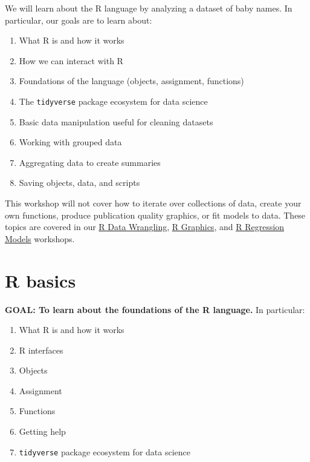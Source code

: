 \documentclass[
]{book}
\providecommand{\tightlist}{%
  \setlength{\itemsep}{0pt}\setlength{\parskip}{0pt}}
\begin{document}
\begin{alert}

We will learn about the R language by analyzing a dataset of baby names. In particular, our goals are to learn about:

\begin{enumerate}
\def\labelenumi{\arabic{enumi}.}
\tightlist
\item
  What R is and how it works
\item
  How we can interact with R
\item
  Foundations of the language (objects, assignment, functions)
\item
  The \texttt{tidyverse} package ecosystem for data science
\item
  Basic data manipulation useful for cleaning datasets
\item
  Working with grouped data
\item
  Aggregating data to create summaries
\item
  Saving objects, data, and scripts
\end{enumerate}

This workshop will not cover how to iterate over collections of data, create your own functions, produce publication quality graphics, or fit models to data. These topics are covered in our \href{./RDataWrangling.html}{R Data Wrangling}, \href{./Rgraphics.html}{R Graphics}, and \href{./Rmodels.html}{R Regression Models} workshops.

\end{alert}

\hypertarget{r-basics}{%
\section{R basics}\label{r-basics}}

\begin{alert}

\textbf{GOAL: To learn about the foundations of the R language.} In particular:

\begin{enumerate}
\def\labelenumi{\arabic{enumi}.}
\tightlist
\item
  What R is and how it works
\item
  R interfaces
\item
  Objects
\item
  Assignment
\item
  Functions
\item
  Getting help
\item
  \texttt{tidyverse} package ecosystem for data science
\end{enumerate}

\end{alert}
\end{document}
